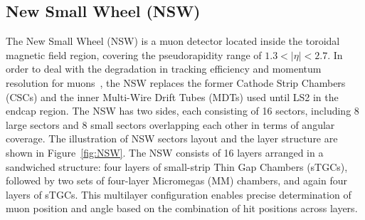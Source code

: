 \subsection{New Small Wheel (NSW)}
The New Small Wheel (NSW) is a muon detector located inside the toroidal magnetic field region, covering the pseudorapidity range of $1.3 < |\eta| < 2.7$. In order to deal with the degradation in tracking efficiency and momentum resolution for muons~\cite{Muon_TDR_NSW}, the NSW replaces the former Cathode Strip Chambers (CSCs) and the inner Multi-Wire Drift Tubes (MDTs) used until LS2 in the endcap region. The NSW has two sides, each consisting of 16 sectors, including 8 large sectors and 8 small sectors overlapping each other in terms of angular coverage. The illustration of NSW sectors layout and the layer structure are shown in Figure~\ref{fig:NSW}. The NSW consists of 16 layers arranged in a sandwiched structure: four layers of small-strip Thin Gap Chambers (sTGCs), followed by two sets of four-layer Micromegas (MM) chambers, and again four layers of sTGCs. This multilayer configuration enables precise determination of muon position and angle based on the combination of hit positions across layers.

